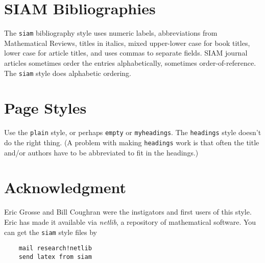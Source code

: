 \section{SIAM Bibliographies}
The {\tt siam} bibliography style uses numeric labels, abbreviations
from Mathematical Reviews, titles in italics, mixed upper-lower case
for book titles, lower case for article titles, and uses commas
to separate fields.
SIAM journal articles sometimes order the entries alphabetically,
sometimes order-of-reference.
The {\tt siam} style does alphabetic ordering.

\section{Page Styles}
Use the {\tt plain} style, or perhaps {\tt empty} or {\tt myheadings}.
The {\tt headings} style doesn't do the right thing.
(A problem with making {\tt headings} work is that
often the title and/or authors have to be abbreviated to fit
in the headings.)

\section*{Acknowledgment}
Eric Grosse and Bill Coughran were the instigators and first users
of this style.
Eric has made it available via {\em netlib}, a repository
of mathematical software.  You can get the {\tt siam} style
files by
\begin{verbatim}
    mail research!netlib
    send latex from siam
\end{verbatim}




